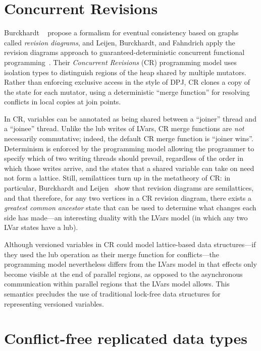 \section{Concurrent Revisions}

Burckhardt \etal~
propose a formalism for eventual consistency based on graphs called
\emph{revision diagrams}, and Leijen, Burckhardt, and Fahndrich apply
the revision diagrams approach to guaranteed-deterministic concurrent
functional programming~.
Their \emph{Concurrent Revisions} (CR) programming model uses
isolation types to distinguish regions of the heap shared by multiple
mutators.  Rather than enforcing exclusive access in the style of DPJ,
CR clones a copy of the state for each mutator, using a deterministic
``merge function'' for resolving conflicts in local copies at join
points.

In CR, variables can be annotated as being shared between a ``joiner''
thread and a ``joinee'' thread.  Unlike the lub writes of LVars, CR
merge functions are \emph{not} necessarily commutative; indeed, the
default CR merge function is ``joiner wins''.  Determinism is enforced
by the programming model allowing the programmer to specify which of
two writing threads should prevail, regardless of the order in which
those writes arrive, and the states that a shared variable can take on
need not form a lattice.  Still, semilattices turn up in the
metatheory of CR: in particular, Burckhardt and
Leijen~ show that revision
diagrams are semilattices, and that therefore, for any two vertices in
a CR revision diagram, there exists a \emph{greatest common ancestor}
state that can be used to determine what changes each side has
made---an interesting duality with the LVars model (in which any two
LVar states have a lub).

Although versioned variables in CR could model lattice-based data
structures---if they used the lub operation as their merge function
for conflicts---the programming model nevertheless differs from the
LVars model in that effects only become visible at the end of parallel
regions, as opposed to the asynchronous communication within parallel
regions that the LVars model allows.  This semantics precludes the use
of traditional lock-free data structures for representing versioned
variables.

\section{Conflict-free replicated data types}
\ifdefined\JOURNAL

